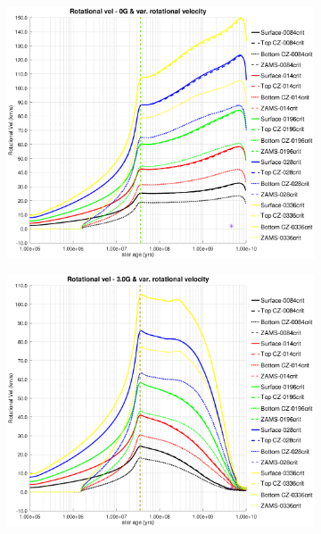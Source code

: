 \documentclass[fleqn,usenatbib]{mnras}
\begin{document}
{{\begin{figure}
    \centering
    \begin{subfigure}[h]{0.47\textwidth}
    \includegraphics[trim = 30mm 15mm 20mm 15mm, clip,width=\textwidth]{figures/rot_vel_var_vel_0_0g.eps}
    \label{fig:subim41}
    \end{subfigure}
    \begin{subfigure}[h]{0.47\textwidth}
    \includegraphics[trim = 30mm 15mm 20mm 15mm, clip,width=\textwidth]{figures/rot_vel_var_vel_3_0g.eps}
    \label{fig:subim42}
    \end{subfigure}

\end{figure}}}
\end{document}
